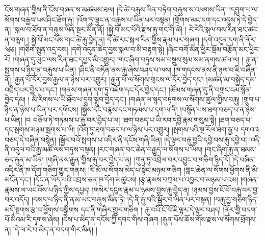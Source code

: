 ངོས་གཞན་གྱིས་ནི་ངོས་གཞན་ས་མཚམས་ཐལ། །དེ་ཚེ་བརྐུས་ཡིན་བཏེག་བརྐུས་ས་འཕགས་ཡིན། །དབྱུག་པ་ལ་སོགས་བརྒྱབ་པས་ཤིང་ཐོག་རྐུ། །འོག་ཏུ་ལྟུང་ན་བརྐུས་པ་ཡིན་པར་བསྟན། །གྲོགས་མང་དག་དང་འདུས་ཏེ་དེ་བྱེད་ན། །སྐལ་བ་ཐོབ་ན་བརྐུས་ཡིན་སྔར་མིན་ནོ། །སྐྱེ་བོ་མང་པོའི་རྫས་རྐུ་གང་གི་ཚེ། ། རེ་རེའི་སྐལ་བས་རིན་ཐང་ཚང་ན་བརླག ། སྐྱེ་བོ་མང་པོས་གང་ཚེ་རྐུ་བྱེད་ན། དེ་ཚེ་རང་སྐལ་རིན་གྱིས་རྣམ་པར་གཞག །དགེ་འདུན་དག་ནི་ནོར་༄༅། །གཅིག་སྤུན་འདྲ་བས། །དགེ་འདུན་ཆེད་བྱས་སྐལ་བ་མི་བརྟག་སྟེ། །ཞིང་བགོ་མིན་ཕྱིར་སྡོམ་བརྩོན་མང་ཕྱིར་རོ། །གཞན་དུ་ལུང་ལས་རིན་ཐང་དཔྱད་མི་འགྱུར། །གང་ཞིག་བཏུས་སམ་བསྡུས་སུམ་སམ་ནགས་ཚལ་ལ། ། རྐུ་ན་སྤགས་པ་ཉིད་ན་བརྐུས་པ་ཡིན། །ཤིང་ནི་བཏོན་ནས་རྐུ་ཞེས་བཤད་པ་ལས། །ཁ་གདངས་ནས་ནི་ཉལ་བ་ཇི་བཞིན་ནོ། །རྒྱན་པོ་དོར་བྱས་རྒྱལ་ན་ཉེས་པར་འགྱུར། །རྒྱན་པོ་ལ་སོགས་གྲངས་ལ་དོར་བྱེད་དང་། །མཚན་མ་བསྐྱེད་དམ་འབྲིད་པར་བྱེད་པ་དང་། །གནས་གཞན་དག་ཏུ་འཇོག་དང་དོར་བྱེད་དང་། །ཚོམས་གཞན་དུ་ནི་བགྲང་ངམ་སྙོན་བྱེད་དམ། ། མི་རིགས་པ་ཡི་ཐོབ་པ་དྲུག་སྒྲུབ་བྱེད་དང་། །གཞན་ལ་སྙད་བཏགས་ལ་སོགས་ཚུལ་གྱིས་བརྐུ། །གྲུབ་པ་ཉིད་ན་ཉེས་པ་ཡིན་པར་དགོངས། །སྐྱེས་དང་བརྙས་དང་གཏམས་པ་དག་ལ་ནི། །བསྙོན་པས་ཐག་བཅད་པ་ན་ཉེས་པ་ཡིན། །བ བཅོལ་ཏེ་གཏམས་པ་རྐུ་བར་བྱེད་པ་ལ། །ཐག་བཅད་པ་ཡི་རབ་དབྱེ་རྣམ་གསུམ་སྟེ། །ཐག་བཅད་པ་དང་སྦགས་མཉམ་སྦགས་པ་ཡི། །འོག་ཏུ་ཐག་བཅད་པ་ལ་ཉེས་པར་འགྱུར། །སྤགས་པའི་སྔ་རོལ་ཐག་རྒྱ་པ དགའ་༣ བཅད་དེ་བཞིན་བསྙེན། །སྦྱོར་བའོ་སྤགས་པ་འདིར་ནི་དངོས་གཞི་ཡིན། །དེ་ལྟར་བརྐུ་བྱའི་དབྱེ་བས་རྐུ་དབྱེ་བ། །འདི་ནི་འདུལ་བའི་རྒྱ་མཚོ་ལས་བཏུས་བསྟན། །རང་གཞན་བང་ཆེན་བརྒྱུད་ལ་སོགས་པ་ཡིས། །གང་ཞིག་རྐུ་ན་ཐམས་ཅད་རྐུན་མ་ཡིན། །གཞི་ནས་རྒྱུན་གྱིས་རྐུ་བར་བྱེད་པ་ན། །ཀུན་ཏུ་འབྲེལ་བར་འབྱུང་བ་གཅིག་ཉིད་དོ། །དེ་བཞིན་འདིར་ནི་ཁ་དོག་གཅིག་གྱུར་གནས། །རི་མོ་ལ་སོགས་མེད་པ་སྟེང་མཉམ་གཅིག །གླང་ཆེན་ལ་སོགས་ཕྱོགས་ནི་མི་མངོན་དང་། །དོང་ན་ཡོད་པའི་འབྲས་ཅན་ཁ་དོག་མཚུངས། །རྩྭ་རྣམས་བཀྲམ་པ་འབྱར་བ་མཉམ་པ་འམ། །གཞན་རྣམས་ལ་ཡང་འོས་པ་ཉིད་ཀྱིས་དཔྱད། །གསེར་དངུལ་རྣམ་པ་ཉམས་བྱས་རྐུ་བྱེད་ན། །ཉམས་བྱས་ངོ་བོ་བརྐུ་བར་བྱ་བར་འདོད། །བསད་པ་ཉིད་ནི་ནམ་ཡང་བརྐུས་མིན་ཏེ། །དེ་ནི་རྐུ་བའི་སྦྱོར་བ་ཡིན་པར་བསྟན། །བརྐུ་བྱ་གཅིག་ཉིད་མདོ་སྔགས་རྩ་བ་ཕྱོགས་བསྒྲིགས དང་ནི་གཞིར་གྱུར་གཅིག ། རྐུ་བའི་ངོ་བོ་ཇི་ལྟར་དེ་ལྟར་བཤད། །ནོར་གྱི་བདག་པོ་མིའམ་རི་དྭགས་ཞེས། །ངེས་པ་མེད་ན་དངོས་ཀྱི་དབང་གིས་གཞག །རྐུན་པོས་ཆོས་གོས་རྫས་ལ་སོགས་ཕྲོགས་ན། །དེ་ལ་རེ་བ་མེད་ན་བདག་གིར་མིན། །
